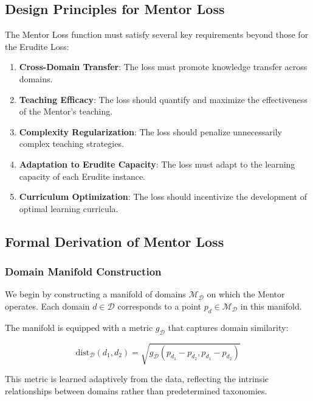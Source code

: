 \subsection{Design Principles for Mentor Loss}

The Mentor Loss function must satisfy several key requirements beyond those for the Erudite Loss:

\begin{enumerate}
\item \textbf{Cross-Domain Transfer}: The loss must promote knowledge transfer across domains.

\item \textbf{Teaching Efficacy}: The loss should quantify and maximize the effectiveness of the Mentor's teaching.

\item \textbf{Complexity Regularization}: The loss should penalize unnecessarily complex teaching strategies.

\item \textbf{Adaptation to Erudite Capacity}: The loss must adapt to the learning capacity of each Erudite instance.

\item \textbf{Curriculum Optimization}: The loss should incentivize the development of optimal learning curricula.
\end{enumerate}

\subsection{Formal Derivation of Mentor Loss}

\subsubsection{Domain Manifold Construction}

We begin by constructing a manifold of domains $\mathcal{M}_{\mathcal{D}}$ on which the Mentor operates. Each domain $d \in \mathcal{D}$ corresponds to a point $p_d \in \mathcal{M}_{\mathcal{D}}$ in this manifold.

The manifold is equipped with a metric $g_{\mathcal{D}}$ that captures domain similarity:

\begin{equation}
\text{dist}_{\mathcal{D}}(d_1, d_2) = \sqrt{g_{\mathcal{D}}(p_{d_1} - p_{d_2}, p_{d_1} - p_{d_2})}
\end{equation}

This metric is learned adaptively from the data, reflecting the intrinsic relationships between domains rather than predetermined taxonomies.

